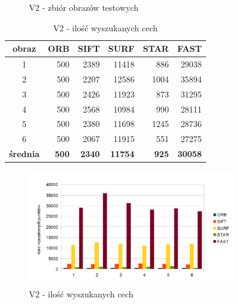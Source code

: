 \begin{figure}[!htb]
\begin{center}
{}
\caption{V2 - zbiór obrazów testowych}
\label{fig:v2_set}
\end{center}
\end{figure}



\begin{table}[htbp]
  \centering
  \caption{V2 - ilość wyszukanych cech}
    \begin{tabular}{|c|r|r|r|r|r|}\hline
    
    obraz & \textbf{ORB} & \textbf{SIFT} & \textbf{SURF} & \textbf{STAR} & \textbf{FAST} \\\hline
    
   
    1 & 500 & 2389 & 11418 & 886 & 29038 \\
    2 & 500 & 2207 & 12586 & 1004 & 35894 \\
    3 & 500 & 2426 & 11923 & 873 & 31295 \\
    4 & 500 & 2568 & 10984 & 990 & 28111 \\
    5 & 500 & 2380 & 11698 & 1245 & 28736 \\
    6 & 500 & 2067 & 11915 & 551 & 27275 \\\hline
    \textbf{średnia} & \textbf{500} & \textbf{2340} & \textbf{11754} & \textbf{925} & \textbf{30058} \\
    \hline
    \end{tabular}%
  \label{tab:v2_f1}%
\end{table}%


\begin{figure}
\centering
\includegraphics[width=0.8\textwidth]{pict/slowik/v2/f1.png}
\caption{V2 - ilość wyszukanych cech}
\label{fig:v2_f1}
\end{figure}


